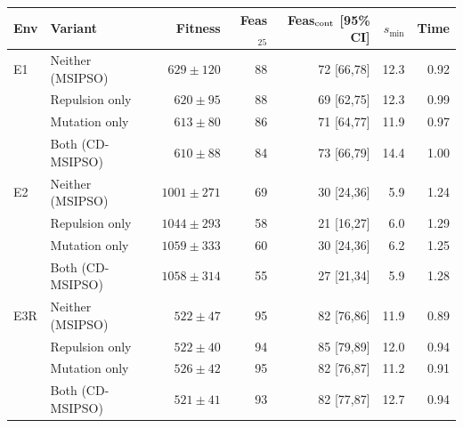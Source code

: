 \begin{tabular}{llrrrrr}
\hline
Env & Variant & Fitness & Feas$_{25}$ & Feas$_{\rm cont}$ [95\% CI] & $s_{\min}$ & Time \\
\hline
E1 & Neither (MSIPSO) & $629\pm120$ & 88 & 72 [66,78] & 12.3 & 0.92 \\
 & Repulsion only & $620\pm95$ & 88 & 69 [62,75] & 12.3 & 0.99 \\
 & Mutation only & $613\pm80$ & 86 & 71 [64,77] & 11.9 & 0.97 \\
 & Both (CD-MSIPSO) & $610\pm88$ & 84 & 73 [66,79] & 14.4 & 1.00 \\
\hline
E2 & Neither (MSIPSO) & $1001\pm271$ & 69 & 30 [24,36] & 5.9 & 1.24 \\
 & Repulsion only & $1044\pm293$ & 58 & 21 [16,27] & 6.0 & 1.29 \\
 & Mutation only & $1059\pm333$ & 60 & 30 [24,36] & 6.2 & 1.25 \\
 & Both (CD-MSIPSO) & $1058\pm314$ & 55 & 27 [21,34] & 5.9 & 1.28 \\
\hline
E3R & Neither (MSIPSO) & $522\pm47$ & 95 & 82 [76,86] & 11.9 & 0.89 \\
 & Repulsion only & $522\pm40$ & 94 & 85 [79,89] & 12.0 & 0.94 \\
 & Mutation only & $526\pm42$ & 95 & 82 [76,87] & 11.2 & 0.91 \\
 & Both (CD-MSIPSO) & $521\pm41$ & 93 & 82 [77,87] & 12.7 & 0.94 \\
\hline
\end{tabular}